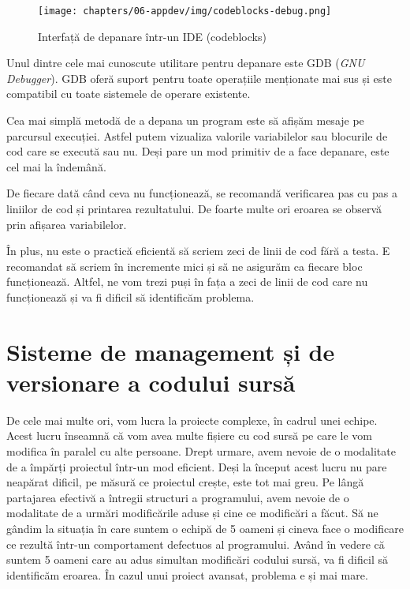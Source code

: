 \begin{figure}[!htbp]
  \centering
  \texttt{[image: chapters/06-appdev/img/codeblocks-debug.png]}
  \caption{Interfață de depanare într-un IDE (codeblocks)}
  \label{fig:appdev:ide-debug}
\end{figure}

Unul dintre cele mai cunoscute utilitare pentru depanare este GDB  (\textit{GNU Debugger}).
GDB oferă suport pentru toate operațiile menționate mai sus și este compatibil cu toate sistemele de operare existente.

Cea mai simplă metodă de a depana un program este să afișăm mesaje pe parcursul execuției.
Astfel putem vizualiza valorile variabilelor sau blocurile de cod care se execută sau nu.
Deși pare un mod primitiv de a face depanare, este cel mai la îndemână.

De fiecare dată când ceva nu funcționează, se recomandă verificarea pas cu pas a liniilor de cod și printarea rezultatului.
De foarte multe ori eroarea se observă prin afișarea variabilelor.

În plus, nu este o practică eficientă să scriem zeci de linii de cod fără a testa.
E recomandat să scriem în incremente mici și să ne asigurăm ca fiecare bloc funcționează.
Altfel, ne vom trezi puși în fața a zeci de linii de cod care nu funcționează și va fi dificil să identificăm problema.

\section{Sisteme de management și de versionare a codului sursă}
\label{sec:appdev-versioning}

De cele mai multe ori, vom lucra la proiecte complexe, în cadrul unei echipe.
Acest lucru înseamnă că vom avea multe fișiere cu cod sursă pe care le vom modifica în paralel cu alte persoane.
Drept urmare, avem nevoie de o modalitate de a împărți proiectul într-un mod eficient.
Deși la început acest lucru nu pare neapărat dificil, pe măsură ce proiectul crește, este tot mai greu.
Pe lângă partajarea efectivă a întregii structuri a programului, avem nevoie de o modalitate de a urmări modificările aduse și cine ce modificări a făcut.
Să ne gândim la situația în care suntem o echipă de 5 oameni și cineva face o modificare ce rezultă într-un comportament defectuos al programului.
Având în vedere că suntem 5 oameni care au adus simultan modificări codului sursă, va fi dificil să identificăm eroarea.
În cazul unui proiect avansat, problema e și mai mare.

